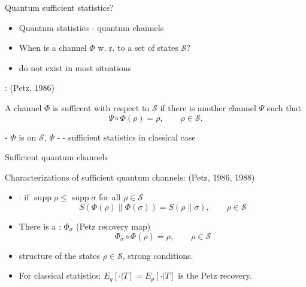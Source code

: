 \documentclass[mathserif]{beamer}
\newcommand{\<}{\langle}
\renewcommand{\>}{\rangle}
\newcommand{\supp}{\operatorname{supp}}
\newcommand{\Se}{\mathcal S}
\begin{document}
\begin{frame}{Quantum sufficient statistics?}

\begin{itemize}

\item Quantum statistics - quantum channels
\vskip 3mm
\item When is a channel $\Phi$  w. r. to a set of states
$\mathcal S$?
\vskip 3mm
\item {} do not exist in most situations


\end{itemize}

\bigskip 

: {\small (Petz, 1986)}

\medskip 
A channel $\Phi$ is sufficent with respect to $\mathcal S$ if there is another channel
$\Psi$ such that 
\[
\Psi\circ\Phi(\rho)=\rho,\qquad \rho\in \Se.
\]

- $\Phi$ is  on $\Se$, $\Psi$ - 
\vskip 2mm
- sufficient statistics in classical case

\end{frame}

\begin{frame}{Sufficient quantum channels}

Characterizations of sufficient quantum channels: {\small (Petz, 1986, 1988)}

\bigskip
\begin{itemize}
\item {}: if $\supp \rho\le \supp \sigma$ for all $\rho\in \Se$
\[
S(\Phi(\rho)\|\Phi(\sigma))=S(\rho\|\sigma),\qquad \rho\in \Se
\]
\item There is a :  $\Phi_\sigma$ (Petz recovery map)
\[
\Phi_\sigma\circ \Phi(\rho)=\rho,\qquad \rho\in  \Se
\]
\item structure of the states $\rho\in \Se$, strong conditions.
\vskip 3mm

\item For classical statistics: $E_q[\cdot|T]=E_p[\cdot|T]$ is the Petz recovery.


\end{itemize}



\end{frame}
\end{document}
